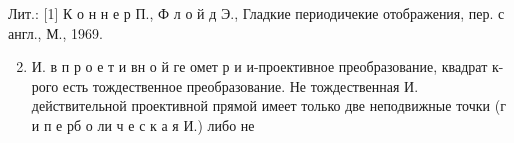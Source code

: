 \documentclass[10pt]{article}
\begin{document}
Лит.: [1] К о н н е р П., Ф л о й д Э., Гладкие периодичекие отображения, пер. с англ., М., 1969.



\begin{enumerate}

  \setcounter{enumi}{1}

  \item И. в п р о е т и вн о й ге омет р и и-проективное преобразование, квадрат к-рого есть тождественное преобразование. Не тождественная И. действительной проективной прямой имеет только две неподвижные точки (г и п е рб о ли ч е с к а я И.) либо не

\end{enumerate}
\end{document}
